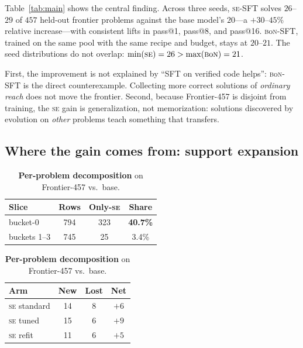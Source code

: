 \documentclass{article}
\makeatletter
\newcommand{\se}{\textnormal{\textsc{se}}}
\newcommand{\bon}{\textnormal{\textsc{b}o\textsc{n}}}
\newcommand{\pass}[1]{pass@#1}
\makeatother
\begin{document}
Table~\ref{tab:main} shows the central finding. Across three seeds, \se{}-SFT solves $26$--$29$ of $457$ held-out frontier problems against the base model's $20$---a $+30$--$45\%$ relative increase---with consistent lifts in \pass{1}, \pass{8}, and \pass{16}. \bon{}-SFT, trained on the same pool with the same recipe and budget, stays at $20$--$21$. The seed distributions do not overlap: $\min(\se{}) = 26 > \max(\bon{}) = 21$.

First, the improvement is not explained by ``SFT on verified code helps'': \bon{}-SFT is the direct counterexample. Collecting more correct solutions of \emph{ordinary reach} does not move the frontier. Second, because Frontier-457 is disjoint from training, the \se{} gain is generalization, not memorization: solutions discovered by evolution on \emph{other} problems teach something that transfers.

\subsection{Where the gain comes from: support expansion}
\label{sec:provenance}

\begin{table}[t]
\begin{minipage}[t]{0.52\linewidth}
\caption{\textbf{Provenance of training signal.} Share of SFT rows whose solution no ordinary-sampling pipeline found (\emph{only-\se{}}).}
\label{tab:onlyse}
\centering
\small
\begin{tabular}{lccc}
\toprule
Slice & Rows & Only-\se{} & Share \\
\midrule
bucket-$0$ & 794 & 323 & \textbf{40.7\%} \\
buckets 1--3 & 745 & 25 & 3.4\% \\
\bottomrule
\end{tabular}
\end{minipage}\hfill
\begin{minipage}[t]{0.44\linewidth}
\caption{\textbf{Per-problem decomposition} on Frontier-457 vs.\ base.}
\label{tab:decomp}
\centering
\small
\begin{tabular}{lccc}
\toprule
Arm & New & Lost & Net \\
\midrule
\se{} standard & 14 & 8 & $+6$ \\
\se{} tuned & 15 & 6 & $+9$ \\
\se{} refit & 11 & 6 & $+5$ \\
\bottomrule
\end{tabular}
\end{minipage}
\end{table}
\end{document}
